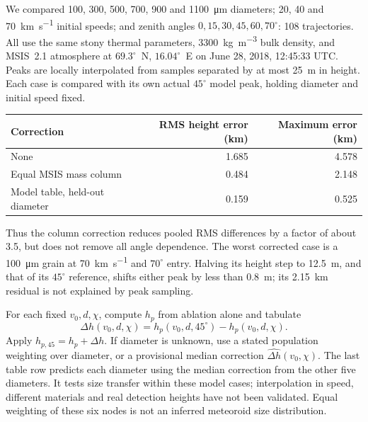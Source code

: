 \documentclass[10pt]{article}
\newif\ifscriptprovenance
\newcommand{\scriptprovenance}[1]{%
  \ifscriptprovenance\par\vspace{1pt}{\footnotesize\itshape Script: \texttt{#1}.}\fi}
\newcommand{\mmsection}[1]{%
  \Needspace{4\baselineskip}\par\vspace{0.45em}{\bfseries #1}\par\vspace{-0.12em}%
}
\begin{document}
\newpage
\mmsection{Check using the native Rust ablation model}
We compared 100, 300, 500, 700, 900 and 1100~\si{\micro m} diameters;
20, 40 and \SI{70}{km.s^{-1}} initial speeds; and zenith angles
$0,15,30,45,60,70^\circ$: 108 trajectories. All use the same stony thermal
parameters, \SI{3300}{kg.m^{-3}} bulk density, and MSIS~2.1 atmosphere at
$69.3^\circ$~N, $16.04^\circ$~E on June 28, 2018, 12:45:33 UTC.
Peaks are locally interpolated from samples separated by at most
\SI{25}{m} in height. Each case is compared with its own actual $45^\circ$
model peak, holding diameter and initial speed fixed.

\begin{center}
\begin{tabular}{lrr}
\toprule
Correction & RMS height error (km) & Maximum error (km)\\
\midrule
None & 1.685 & 4.578\\
Equal MSIS mass column & 0.484 & 2.148\\
Model table, held-out diameter & 0.159 & 0.525\\
\bottomrule
\end{tabular}
\end{center}
\scriptprovenance{examples/normalize\_ablation\_zenith.py; src/bin/meteor-ablation.rs}

Thus the column correction reduces pooled RMS differences by a factor
of about 3.5, but does not remove all angle dependence. The worst corrected
case is a \SI{100}{\micro m} grain at \SI{70}{km.s^{-1}} and
$70^\circ$ entry. Halving its height step to \SI{12.5}{m}, and that of its
$45^\circ$ reference, shifts either peak by less than \SI{0.8}{m}; its
\SI{2.15}{km} residual is not explained by peak sampling.

\mmsection{Preferred correction for a height--speed histogram}
For each fixed $v_0,d,\chi$, compute $h_p$ from ablation alone and tabulate
\begin{equation}
 \Delta h(v_0,d,\chi)=h_p(v_0,d,45^\circ)-h_p(v_0,d,\chi).
\end{equation}
Apply $h_{p,45}=h_p+\Delta h$. If diameter is unknown, use a stated
population weighting over diameter, or a provisional median correction
$\widehat{\Delta h}(v_0,\chi)$. The last table row predicts each diameter
using the median correction from the other five diameters. It tests size
transfer within these model cases; interpolation in speed, different materials
and real detection heights have not been validated. Equal weighting of these
six nodes is not an inferred meteoroid size distribution.
\end{document}
